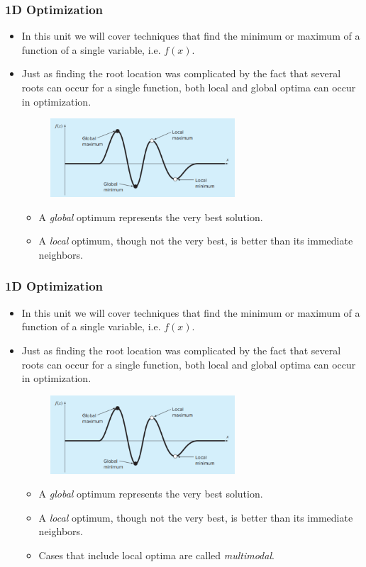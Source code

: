 \documentclass{if-beamer}
\begin{document}
\begin{frame}[t]
	\frametitle{1D Optimization}
	\begin{itemize}
		\item In this unit we will cover techniques that find the minimum or maximum of a function of a single variable, i.e. $f(x)$.
		\item Just as finding the root location was complicated by the fact that several roots can occur for a single function, both local
		and global optima can occur in optimization.
		\begin{figure}
			\centering
			\includegraphics[width = 0.65\textwidth]{figures/localglobal}
		\end{figure}
		\begin{itemize}
			\item A \textit{global} optimum represents the very best solution. 
			\item A \textit{local} optimum, though not the very best, is better than its immediate neighbors. 
		\end{itemize}
	\end{itemize}
\end{frame}

\begin{frame}[t]
	\frametitle{1D Optimization}
	\begin{itemize}
		\item In this unit we will cover techniques that find the minimum or maximum of a function of a single variable, i.e. $f(x)$.
		\item Just as finding the root location was complicated by the fact that several roots can occur for a single function, both local
		and global optima can occur in optimization.
		\begin{figure}
			\centering
			\includegraphics[width = 0.65\textwidth]{figures/localglobal}
		\end{figure}
		\begin{itemize}
			\item A \textit{global} optimum represents the very best solution. 
			\item A \textit{local} optimum, though not the very best, is better than its immediate neighbors. 
			\item Cases that include local optima are called \textit{multimodal}. 
		\end{itemize}
	\end{itemize}
\end{frame}
\end{document}
